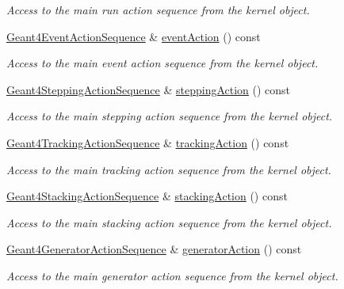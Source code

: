 \begin{DoxyCompactItemize}
\begin{DoxyCompactList}\small\item\em Access to the main run action sequence from the kernel object. \end{DoxyCompactList}\item 
\hyperlink{class_d_d4hep_1_1_simulation_1_1_geant4_event_action_sequence}{Geant4\+Event\+Action\+Sequence} \& \hyperlink{class_d_d4hep_1_1_simulation_1_1_geant4_action_a57665214b75d7e7682998dcf1d1ef7e2}{event\+Action} () const
\begin{DoxyCompactList}\small\item\em Access to the main event action sequence from the kernel object. \end{DoxyCompactList}\item 
\hyperlink{class_d_d4hep_1_1_simulation_1_1_geant4_stepping_action_sequence}{Geant4\+Stepping\+Action\+Sequence} \& \hyperlink{class_d_d4hep_1_1_simulation_1_1_geant4_action_a2dd6a5716aedfdab406510a4239b0c5a}{stepping\+Action} () const
\begin{DoxyCompactList}\small\item\em Access to the main stepping action sequence from the kernel object. \end{DoxyCompactList}\item 
\hyperlink{class_d_d4hep_1_1_simulation_1_1_geant4_tracking_action_sequence}{Geant4\+Tracking\+Action\+Sequence} \& \hyperlink{class_d_d4hep_1_1_simulation_1_1_geant4_action_a42e67d0f379567b039b4249bd650a30b}{tracking\+Action} () const
\begin{DoxyCompactList}\small\item\em Access to the main tracking action sequence from the kernel object. \end{DoxyCompactList}\item 
\hyperlink{class_d_d4hep_1_1_simulation_1_1_geant4_stacking_action_sequence}{Geant4\+Stacking\+Action\+Sequence} \& \hyperlink{class_d_d4hep_1_1_simulation_1_1_geant4_action_afdcb408fdab69261bdd9351c553e8103}{stacking\+Action} () const
\begin{DoxyCompactList}\small\item\em Access to the main stacking action sequence from the kernel object. \end{DoxyCompactList}\item 
\hyperlink{class_d_d4hep_1_1_simulation_1_1_geant4_generator_action_sequence}{Geant4\+Generator\+Action\+Sequence} \& \hyperlink{class_d_d4hep_1_1_simulation_1_1_geant4_action_a401a8dceb3d540c069fc24f66d41bf64}{generator\+Action} () const
\begin{DoxyCompactList}\small\item\em Access to the main generator action sequence from the kernel object. \end{DoxyCompactList}\end{DoxyCompactItemize}
